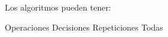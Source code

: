 
\question Los algoritmos pueden tener:

  \begin{oneparchoices}
    \choice Operaciones
    \choice Decisiones
    \choice Repeticiones
    \CorrectChoice Todas
  \end{oneparchoices}
